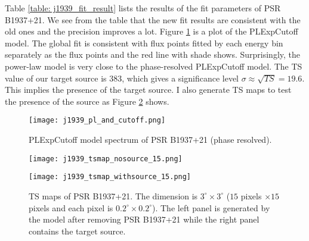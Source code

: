 \documentclass[12pt]{report}
\begin{document}
        Table \ref{table: j1939_fit_result} lists the results of the fit parameters of 
        PSR B1937+21. We see from the table that the new fit results are 
        consistent with the old ones and the precision improves a lot. 
        Figure \ref{fig: j1939_pl_and_cutoff} is a plot of the PLExpCutoff model.
        The global fit is consistent with flux points fitted by each energy bin separately 
        as the flux points and the red line with shade shows. Surprisingly, the power-law model
        is very close to the phase-resolved PLExpCutoff model. 
        The TS value of our target source is $383$, which gives 
        a significance level $\sigma \approx \sqrt{TS} = 19.6$. This implies the presence 
        of the target source. I also generate TS maps to test the presence of the source 
        as Figure \ref{fig: j1939_tsmap_comparison_15} shows. 
        
        \begin{figure}[!htp]
          \centering 
          \texttt{[image: j1939\_pl\_and\_cutoff.png]}
          \caption{PLExpCutoff model spectrum of PSR B1937+21 (phase resolved). }
          \label{fig: j1939_pl_and_cutoff}
        \end{figure}
          
        \begin{figure}[!htp]
          \centering
          \begin{minipage}{0.40\textwidth}
            \begin{center} 
              \texttt{[image: j1939\_tsmap\_nosource\_15.png]}
            \end{center}
          \end{minipage}
          \begin{minipage}{0.40\textwidth}
            \begin{center}
              \texttt{[image: j1939\_tsmap\_withsource\_15.png]}
            \end{center}
          \end{minipage}
          \caption{TS maps of PSR B1937+21. The dimension is $3^{\circ} \times 3^{\circ}$
            ($15$ pixels $\times 15$ pixels and each pixel is 
            $0.2^{\circ} \times 0.2^{\circ}$). The left panel is generated by the model 
            after removing PSR B1937+21 while the right panel contains the target source.}
          \label{fig: j1939_tsmap_comparison_15}
        \end{figure}
\end{document}
